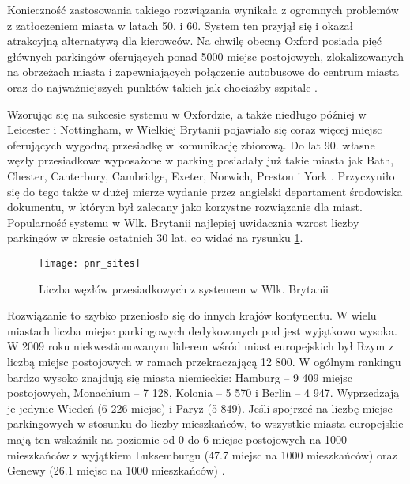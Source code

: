\documentclass[twoside,12pt]{article}
\begin{document}
		Konieczność zastosowania takiego rozwiązania wynikała z ogromnych problemów z zatłoczeniem miasta w latach 50. i 60. System ten przyjął się i okazał atrakcyjną alternatywą dla kierowców. Na chwilę obecną Oxford posiada pięć głównych parkingów \pnr{} oferujących ponad 5000 miejsc postojowych, zlokalizowanych na obrzeżach miasta i zapewniających połączenie autobusowe do centrum miasta oraz do najważniejszych punktów takich jak chociażby szpitale \cite{oxford2}.
		
	Wzorując się na sukcesie systemu w Oxfordzie, a także niedługo później w Leicester i Nottingham, w Wielkiej Brytanii pojawiało się coraz więcej miejsc oferujących wygodną przesiadkę w komunikację zbiorową. Do lat 90. własne węzły przesiadkowe wyposażone w parking posiadały już takie miasta jak Bath, Chester, Canterbury, Cambridge, Exeter, Norwich, Preston i York \cite{rps}. Przyczyniło się do tego także w dużej mierze wydanie przez angielski departament środowiska dokumentu, w którym \pnr{} był zalecany jako korzystne rozwiązanie dla miast. Popularność systemu w Wlk. Brytanii najlepiej uwidacznia wzrost liczby parkingów w okresie ostatnich 30 lat, co widać na rysunku \ref{pnr_sites}.
	
	\begin{figure}[H]
		\centering
		\texttt{[image: pnr\_sites]}\\
		\caption{Liczba węzłów przesiadkowych z systemem \pnr{} w Wlk. Brytanii}
		\label{pnr_sites}
	\end{figure}
	
	Rozwiązanie to szybko przeniosło się do innych krajów kontynentu. W wielu miastach liczba miejsc parkingowych dedykowanych pod \pnr{} jest wyjątkowo wysoka. W 2009 roku niekwestionowanym liderem wśród miast europejskich był Rzym z liczbą miejsc postojowych w ramach \pnr{} przekraczającą 12 800. W ogólnym rankingu bardzo wysoko znajdują się miasta niemieckie: Hamburg -- 9 409 miejsc postojowych, Monachium -- 7 128, Kolonia -- 5 570 i Berlin -- 4 947. Wyprzedzają je jedynie Wiedeń (6 226 miejsc) i Paryż (5 849). Jeśli spojrzeć na liczbę miejsc parkingowych w stosunku do liczby mieszkańców, to wszystkie miasta europejskie mają ten wskaźnik na poziomie od 0 do 6 miejsc postojowych na 1000 mieszkańców z wyjątkiem Luksemburgu (47.7 miejsc na 1000 mieszkańców) oraz Genewy (26.1 miejsc na 1000 mieszkańców) \cite{eurotest}.
	
\end{document}
